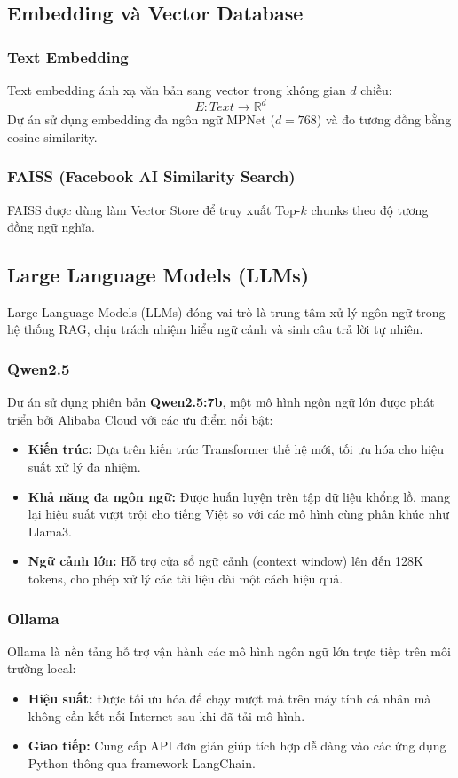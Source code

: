 \documentclass[10pt, conference, a4paper, compsocconf]{IEEEtran}
\begin{document}
\subsection{Embedding và Vector Database}

\subsubsection{Text Embedding}
Text embedding ánh xạ văn bản sang vector trong không gian $d$ chiều:
\begin{equation}
  E: Text \rightarrow \mathbb{R}^{d}
\end{equation}
\noindent Dự án sử dụng embedding đa ngôn ngữ MPNet ($d=768$) và đo tương đồng bằng cosine similarity.

\subsubsection{FAISS (Facebook AI Similarity Search)}
FAISS được dùng làm Vector Store để truy xuất Top-$k$ chunks theo độ tương đồng ngữ nghĩa.

\subsection{Large Language Models (LLMs)}

Large Language Models (LLMs) đóng vai trò là trung tâm xử lý ngôn ngữ trong hệ thống RAG, chịu trách nhiệm hiểu ngữ cảnh và sinh câu trả lời tự nhiên.

\subsubsection{Qwen2.5}
Dự án sử dụng phiên bản \textbf{Qwen2.5:7b}, một mô hình ngôn ngữ lớn được phát triển bởi Alibaba Cloud với các ưu điểm nổi bật:
\begin{itemize}
  \item \textbf{Kiến trúc:} Dựa trên kiến trúc Transformer thế hệ mới, tối ưu hóa cho hiệu suất xử lý đa nhiệm.
  \item \textbf{Khả năng đa ngôn ngữ:} Được huấn luyện trên tập dữ liệu khổng lồ, mang lại hiệu suất vượt trội cho tiếng Việt so với các mô hình cùng phân khúc như Llama3.
  \item \textbf{Ngữ cảnh lớn:} Hỗ trợ cửa sổ ngữ cảnh (context window) lên đến 128K tokens, cho phép xử lý các tài liệu dài một cách hiệu quả.
\end{itemize}

\subsubsection{Ollama}
Ollama là nền tảng hỗ trợ vận hành các mô hình ngôn ngữ lớn trực tiếp trên môi trường local:
\begin{itemize}
  \item \textbf{Hiệu suất:} Được tối ưu hóa để chạy mượt mà trên máy tính cá nhân mà không cần kết nối Internet sau khi đã tải mô hình.
  \item \textbf{Giao tiếp:} Cung cấp API đơn giản giúp tích hợp dễ dàng vào các ứng dụng Python thông qua framework LangChain.
\end{itemize}
\end{document}
